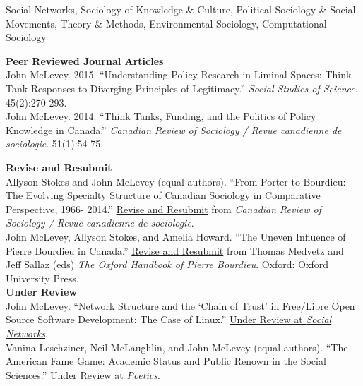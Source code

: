 \documentclass[9pt,usenames,dvipsnames]{article}
\begin{document}
\smallskip
{}

\noindent Social Networks, Sociology of Knowledge \& Culture, Political Sociology \& Social Movements, Theory \& Methods, Environmental Sociology, Computational Sociology \\

\smallskip
{}

\ind \textbf{Peer Reviewed Journal Articles} \\

\ind John McLevey. 2015. ``Understanding Policy Research in Liminal Spaces: Think Tank Responses to Diverging Principles of Legitimacy.'' \emph{Social Studies of Science}. 45(2):270-293. \\

\ind John McLevey. 2014. ``Think Tanks, Funding, and the Politics of Policy Knowledge in Canada.'' \emph{Canadian Review of Sociology / Revue canadienne de sociologie}. 51(1):54-75.\\

\smallskip
{}

\ind \textbf{Revise and Resubmit} \\

\ind Allyson Stokes and John McLevey (equal authors). ``From Porter to Bourdieu: The Evolving Specialty Structure of Canadian Sociology in Comparative Perspective, 1966- 2014.'' \underline{Revise and Resubmit} from \emph{Canadian Review of Sociology / Revue canadienne de sociologie}. \\

\ind John McLevey, Allyson Stokes, and Amelia Howard. ``The Uneven Influence of Pierre Bourdieu in Canada.'' \underline{Revise and Resubmit} from Thomas Medvetz and Jeff Sallaz (eds) \emph{The Oxford Handbook of Pierre Bourdieu}. Oxford: Oxford University Press. \\

\newpage
\ind \textbf{Under Review} \\

\ind John McLevey. ``Network Structure and the `Chain of Trust' in Free/Libre Open Source Software Development: The Case of Linux.'' \underline{Under Review at \emph{Social Networks}}. \\

\ind Vanina Leschziner, Neil McLaughlin, and John McLevey (equal authors). ``The American Fame Game: Academic Status and Public Renown in the Social Sciences.'' \underline{Under Review at \emph{Poetics}}. \\
\end{document}
